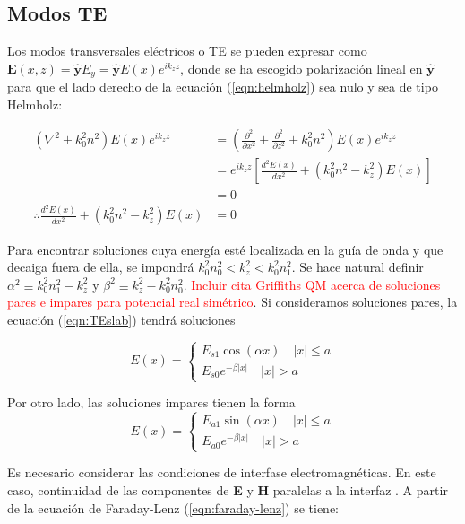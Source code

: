 \subsection{Modos TE}

Los modos transversales eléctricos o TE se pueden expresar como $\textbf{E}(x,z) =\mathbf{\hat{y}} E_y= \mathbf{\hat{y}} E(x)e^{i k_z z }$, donde se ha escogido polarización lineal en $\hat{\textbf{y}}$ para que el lado derecho de la ecuación (\ref{eqn:helmholz}) sea nulo y sea de tipo Helmholz:

\begin{align}
(\nabla^2  + k_0^2n^2) E(x)e^{ik_z z} &=  \left(\frac{\partial^2}{\partial x^2} + \frac{\partial^2}{\partial z^2} + k_0^2n^2\right) E(x)e^{ik_z z } 
\nonumber
\\
&= e^{ik_z z}\left[\frac{d^2  E(x)}{dx^2}  + (k_0^2n^2 -  k_z^2)E(x) \right]
\nonumber
\\
&=0
\nonumber
\\
\therefore \frac{d^2  E(x)}{dx^2}  + (k_0^2n^2 -  k_z^2)E(x) &= 0 \label{eqn:TEslab}
\end{align}

Para encontrar soluciones cuya energía esté localizada en la guía de onda y que decaiga fuera de ella, se impondrá $k_0^2n_0^2 < k_z^2 < k_0^2n_1^2$. Se hace natural definir $\alpha^2\equiv k_0^2n_1^2-k_z^2$ y $\beta^2\equiv k_z^2 - k_0^2n_0^2$. \textcolor{red}{Incluir cita Griffiths QM acerca de soluciones pares e impares para potencial real simétrico}. Si consideramos soluciones pares, la ecuación (\ref{eqn:TEslab}) tendrá soluciones

\begin{equation*}
	E(x) = \left\{\begin{matrix}
	E_{s1}\cos(\alpha x)\quad |x|\le a
	\\
	E_{s0}e^{-\beta|x|} \quad |x|>a
	\end{matrix}\right.
\end{equation*}

Por otro lado, las soluciones impares tienen la forma
\begin{equation*}
	E(x) = \left\{\begin{matrix}
	E_{a1}\sin(\alpha x)\quad |x|\le a
	\\
	E_{a0}e^{-\beta|x|} \quad |x|>a
	\end{matrix}\right.
\end{equation*}


Es necesario considerar las condiciones de interfase electromagnéticas. En este caso, continuidad de las componentes de \textbf{E} y \textbf{H} paralelas a la interfaz . A partir de la ecuación de Faraday-Lenz (\ref{eqn:faraday-lenz}) se tiene:

